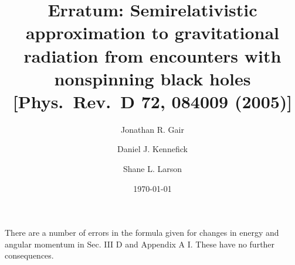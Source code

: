 \documentclass[aps,prd,amsfonts,amssymb,amsmath,nofootinbib,reprint,showpacs]{revtex4-1}
\begin{document}

\title{Erratum: Semirelativistic approximation to gravitational radiation from encounters
with nonspinning black holes \\ {[Phys.\ Rev.\ D 72, 084009 (2005)]}}

\author{Jonathan R. Gair}
\author{Daniel J. Kennefick}
\author{Shane L. Larson}

\date{\today}


\maketitle

There are a number of errors in the formula given for changes in energy and angular momentum in Sec. III D and Appendix A I. These have no further consequences.
\end{document}
